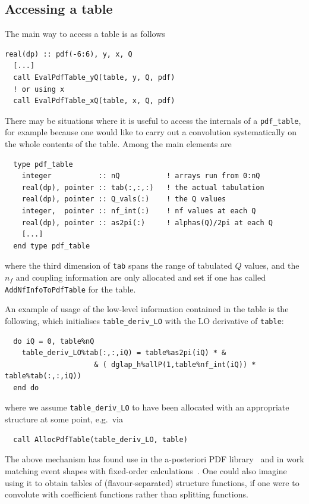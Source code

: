 \documentclass[12pt]{article}
\newcommand{\eg}{e.g.\ }
\newcommand{\ttt}[1]{\texttt{#1}}
\begin{document}
\subsection{Accessing a table}
\label{sec:acc_table}

The main way to access a table is as follows
\begin{lstlisting}
real(dp) :: pdf(-6:6), y, x, Q
  [...]
  call EvalPdfTable_yQ(table, y, Q, pdf)
  ! or using x
  call EvalPdfTable_xQ(table, x, Q, pdf)
\end{lstlisting}
There may be situations where it is useful to access the internals of
a \ttt{pdf\_table}, for example because one would like to carry out a
convolution systematically on the whole contents of the table. Among
the main elements are
\begin{lstlisting}
  type pdf_table
    integer           :: nQ           ! arrays run from 0:nQ
    real(dp), pointer :: tab(:,:,:)   ! the actual tabulation
    real(dp), pointer :: Q_vals(:)    ! the Q values 
    integer,  pointer :: nf_int(:)    ! nf values at each Q
    real(dp), pointer :: as2pi(:)     ! alphas(Q)/2pi at each Q
    [...]
  end type pdf_table
\end{lstlisting}
where the third dimension of \ttt{tab} spans the range of tabulated
$Q$ values, and the $n_f$ and coupling information are only allocated
and set if one has called \ttt{AddNfInfoToPdfTable} for the table.


An example of usage of the low-level information contained in the
table is the following, which initialises \ttt{table\_deriv\_LO} with
the LO derivative of \ttt{table}:
\begin{lstlisting}
  do iQ = 0, table%nQ
    table_deriv_LO%tab(:,:,iQ) = table%as2pi(iQ) * &
                     & ( dglap_h%allP(1,table%nf_int(iQ)) * table%tab(:,:,iQ))
  end do
\end{lstlisting}
where we assume \ttt{table\_deriv\_LO} to have been allocated with an
appropriate structure at some point, \eg via 
\begin{lstlisting}
  call AllocPdfTable(table_deriv_LO, table)
\end{lstlisting}
The above mechanism has found use in the a-posteriori PDF
library~\cite{APPL,Banfi:2007gu} 
and in work matching event shapes with fixed-order
calculations~\cite{caesar,DisResum}.
%
One could also imagine using it to obtain tables of
(flavour-separated) structure functions, if one were to convolute with
coefficient functions rather than splitting functions.
\end{document}
